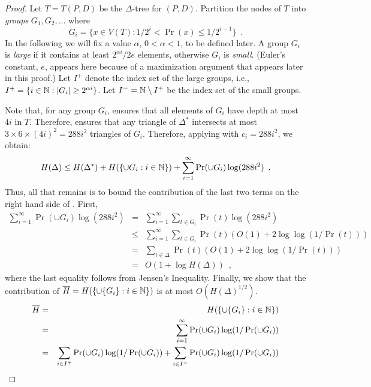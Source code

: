 \documentclass[acmtalg]{acmsmall}
\begin{document}
\begin{proof}
Let $T=T(P,D)$ be the $\Delta$-tree for $(P,D)$.
Partition the nodes of $T$ into
\emph{groups} $G_1,G_2,\ldots$ where
\[
	G_i = \{x\in V(T) : 1/2^{i} < \Pr(x) \le 1/2^{i-1} \} \enspace .
\]
In the following we will fix a value $\alpha$, $0 < \alpha < 1$,
to be defined later.  A group $G_i$ is \emph{large} if it contains
at least $2^{\alpha i}/2e$ elements, otherwise $G_i$ is \emph{small}.
(Euler's constant, $e$, appears here because of a maximization argument
that appears later in this proof.)  Let $I^+$ denote the index set of the large
groups, i.e., $I^{+}=\{i\in\mathbb{N} : |G_i| \ge 2^{\alpha i}\}$.  Let $I^{-}=
\mathbb{N}\setminus I^+$ be the index set of the small groups.

Note that, for any group $G_i$,  ensures that all
elements of $G_i$ have depth at most $4i$ in $T$.  Therefore, 
 ensures that any triangle of
$\Delta^*$ intersects at most $3\times 6\times (4i)^2=288i^2$ 
triangles of $G_{i}$.  Therefore,
applying  with $c_{i}=288i^2$, we obtain:
\begin{equation} 
 H(\Delta) \le 
   H(\Delta^*) + H(\{{\cup G_{i}} : i\in\N\}) 
   + \sum_{i=1}^{\infty}\Pr(\cup G_{i})\log(288i^2)  \enspace .
   \eqlabelx{doit}
\end{equation}
Thus, all that remains is to bound the contribution of the last two
terms on the right hand side of .  First,
\begin{eqnarray*}
   \sum_{i=1}^{\infty}\Pr(\cup G_{i})\log(288i^2)
   &   =  & \sum_{i=1}^\infty\sum_{t\in G_i}\Pr(t)\log(288i^2) \\
   &  \le  & \sum_{i=1}^\infty\sum_{t\in G_i}\Pr(t)(O(1)+2\log\log(1/\Pr(t))) \\
    &  =  & \sum_{t\in\Delta} \Pr(t) (O(1)+2\log\log(1/\Pr(t))) \\
    &  =  & O(1+\log H(\Delta)) \enspace ,
\end{eqnarray*}
where the last equality follows from Jensen's Inequality.
Finally, we show that the contribution of $\overline
H=H(\{\cup\{G_{i}\} : i\in\mathbb{N}\})$ is at most
$O(H(\Delta)^{1/2})$. 
\begin{eqnarray*}
\overline H 
 &  =  & H(\{\cup\{G_{i}\} : i\in\N\}) \\
 &  =  & \sum_{i=1}^\infty\Pr(\cup G_{i})\log(1/\Pr(\cup G_{i})) \\
 &  =  & \sum_{i\in I^+}\Pr(\cup G_{i})\log(1/\Pr(\cup G_{i})) 
         + \sum_{i\in I^-}\Pr(\cup G_{i})\log(1/\Pr(\cup G_{i})) \\

\end{eqnarray*}
\end{proof}
\end{document}

